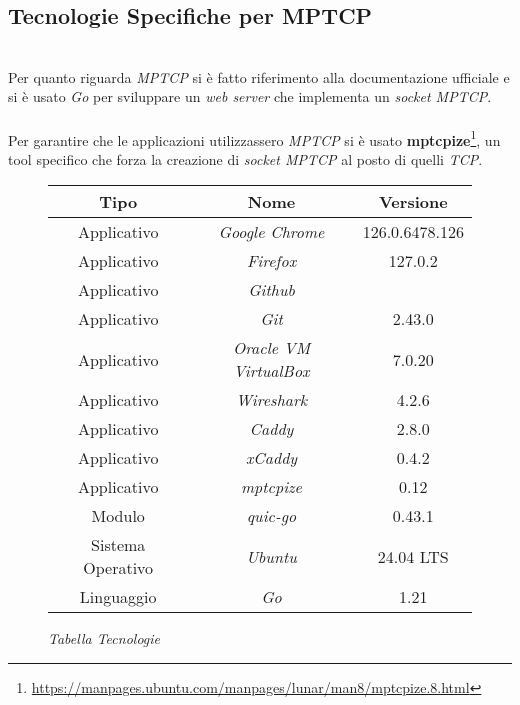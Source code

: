 \subsection{Tecnologie Specifiche per MPTCP}
~\\
\indent Per quanto riguarda \emph{MPTCP} si è fatto riferimento alla documentazione ufficiale \cite{site:mptcp-code} e si è usato \emph{Go} per sviluppare un \emph{web server} che implementa un \emph{socket MPTCP}.
\\\\
Per garantire che le applicazioni utilizzassero \emph{MPTCP} si è usato \textbf{mptcpize}\footnote{\url{https://manpages.ubuntu.com/manpages/lunar/man8/mptcpize.8.html}}, un tool specifico che forza la creazione di \emph{socket MPTCP} al posto di quelli \emph{TCP}.
\hfill
\begin{figure}[!h]
    \centering
    \begin{tabular}{|c|c|c|}
        \hline
        \textbf{Tipo} & \textbf{Nome} & \textbf{Versione} \\
        \hline
        Applicativo & \emph{Google Chrome} & 126.0.6478.126 \\
        \hline
        Applicativo & \emph{Firefox} & 127.0.2 \\
        \hline
        Applicativo & \emph{Github} &  \\
        \hline
        Applicativo & \emph{Git} & 2.43.0 \\
        \hline
        Applicativo & \emph{Oracle VM VirtualBox} & 7.0.20 \\
        \hline
        Applicativo & \emph{Wireshark} & 4.2.6 \\
        \hline
        Applicativo & \emph{Caddy} & 2.8.0 \\
        \hline
        Applicativo & \emph{xCaddy} & 0.4.2 \\
        \hline
        Applicativo & \emph{mptcpize} & 0.12 \\
        \hline
        Modulo & \emph{quic-go} &  0.43.1 \\
        \hline
        Sistema Operativo & \emph{Ubuntu} & 24.04 LTS \\
        \hline
        Linguaggio & \emph{Go} & 1.21 \\
        \hline
    \end{tabular}
    \caption{\emph{Tabella Tecnologie}}
    \label{table-tecnologie}
\end{figure}

\pagebreak

